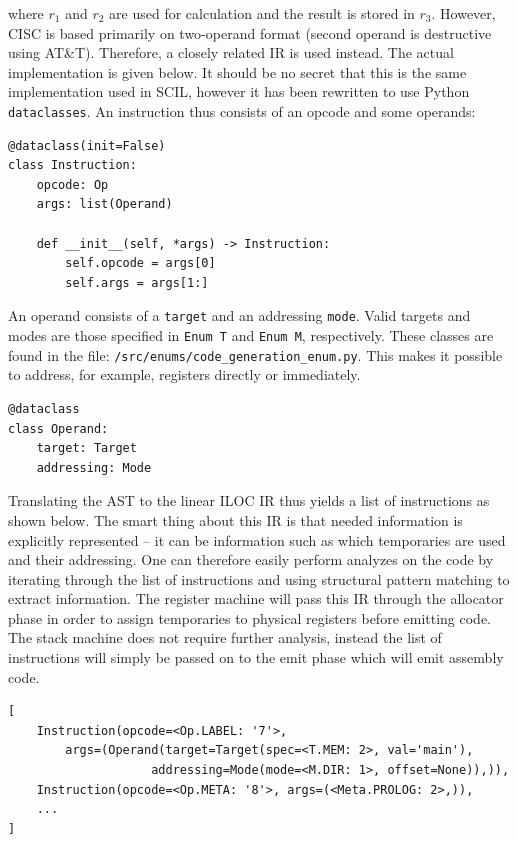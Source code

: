where $r_1$ and $r_2$ are used for calculation and the result is stored in $r_3$. However, CISC is based primarily on two-operand format (second operand is destructive using AT\&T). Therefore, a closely related IR is used instead. The actual implementation is given below. It should be no secret that this is the same implementation used in SCIL, however it has been rewritten to use Python \texttt{dataclasses}. An instruction thus consists of an opcode and some operands:

\begin{verbatim}
@dataclass(init=False)
class Instruction:
    opcode: Op
    args: list(Operand)

    def __init__(self, *args) -> Instruction:
        self.opcode = args[0]
        self.args = args[1:]
\end{verbatim}

An operand consists of a \texttt{target} and an addressing \texttt{mode}. Valid targets and modes are those specified in \texttt{Enum T} and \texttt{Enum M}, respectively. These classes are found in the file: \texttt{/src/enums/code\_generation\_enum.py}. This makes it possible to address, for example, registers directly or immediately.

\begin{verbatim}
@dataclass
class Operand:
    target: Target
    addressing: Mode
\end{verbatim}

Translating the AST to the linear ILOC IR thus yields a list of instructions as shown below. The smart thing about this IR is that needed information is explicitly represented -- it can be information such as which temporaries are used and their addressing. One can therefore easily perform analyzes on the code by iterating through the list of instructions and using structural pattern matching to extract information. The register machine will pass this IR through the allocator phase in order to assign temporaries to physical registers before emitting code. The stack machine does not require further analysis, instead the list of instructions will simply be passed on to the emit phase which will emit assembly code.

\begin{verbatim}
[
    Instruction(opcode=<Op.LABEL: '7'>,
        args=(Operand(target=Target(spec=<T.MEM: 2>, val='main'),
                    addressing=Mode(mode=<M.DIR: 1>, offset=None)),)),
    Instruction(opcode=<Op.META: '8'>, args=(<Meta.PROLOG: 2>,)),
    ...
]
\end{verbatim}

